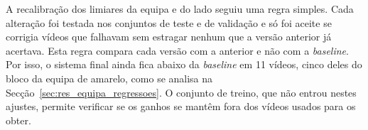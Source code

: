A recalibração dos limiares da equipa e do lado seguiu uma regra simples. Cada alteração foi testada nos conjuntos de teste e de validação e só foi aceite se corrigia vídeos que falhavam sem estragar nenhum que a versão anterior já acertava. Esta regra compara cada versão com a anterior e não com a \emph{baseline}. Por isso, o sistema final ainda fica abaixo da \emph{baseline} em 11 vídeos, cinco deles do bloco da equipa de amarelo, como se analisa na Secção~\ref{sec:res_equipa_regressoes}. O conjunto de treino, que não entrou nestes ajustes, permite verificar se os ganhos se mantêm fora dos vídeos usados para os obter.